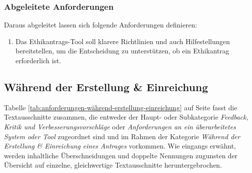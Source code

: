\documentclass[a4paper,12pt,twoside]{scrreprt}
\begin{document}
\subsubsection*{Abgeleitete Anforderungen}
\label{sub-sub-sec:abgeleitete-anforderungen-vorfeld-antrag}

Daraus abgeleitet lassen sich folgende Anforderungen definieren:
\begin{enumerate}[label=\textbf{\#\arabic*}]
    \item Das Ethikantrags-Tool soll klarere Richtlinien und auch Hilfestellungen bereitstellen, um die Entscheidung zu unterstützen, ob ein Ethikantrag erforderlich ist.
\end{enumerate}

\subsection{Während der Erstellung \& Einreichung}
\label{sub-sec:während-erstellung-einreichung}

Tabelle \ref{tab:anforderungen-während-erstellung-einreichung} auf Seite \pageref{tab:anforderungen-während-erstellung-einreichung} fasst die Textausschnitte zusammen, die entweder der Haupt- oder Subkategorie \textit{Feedback, Kritik und Verbesserungsvorschläge} oder \textit{Anforderungen an ein überarbeitetes System oder Tool} zugeordnet sind und im Rahmen der Kategorie \textit{Während der Erstellung \& Einreichung eines Antrages} vorkommen. Wie eingangs erwähnt, werden inhaltliche Überschneidungen und doppelte Nennungen zugunsten der Übersicht auf einzelne, gleichwertige Textausschnitte heruntergebrochen.
\end{document}
